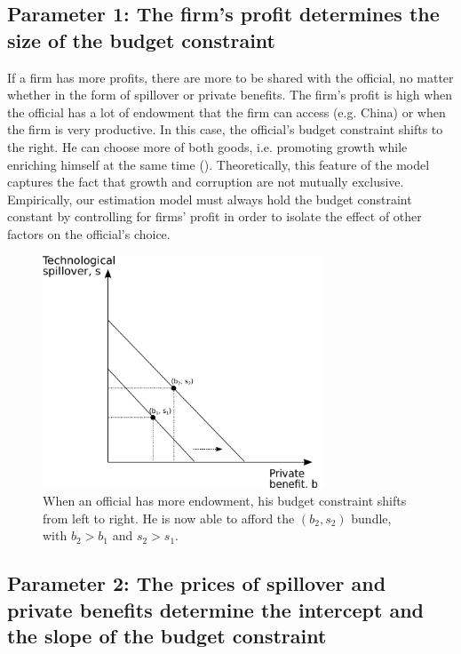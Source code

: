 \subsection{Parameter 1: The firm's profit determines the size of the budget constraint}
\label{sec:theory_budget_constraint_size}

If a firm has more profits, there are more to be shared with the official, no matter whether in the form of spillover or private benefits. The firm's profit is high when the official has a lot of endowment that the firm can access (e.g. China) or when the firm is very productive. In this case, the official's budget constraint shifts to the right. He can choose more of both goods, i.e. promoting growth while enriching himself at the same time (). Theoretically, this feature of the model captures the fact that growth and corruption are not mutually exclusive. Empirically, our estimation model must always hold the budget constraint constant by controlling for firms' profit in order to isolate the effect of other factors on the official's choice.

\begin{figure}[!ht]
	\centering
    \includegraphics[width=0.75\textwidth, height=0.75\textheight,keepaspectratio]{../figure/budget_constraint}
    \caption{When an official has more endowment, his budget constraint shifts from left to right. He is now able to afford the $(b_2, s_2)$ bundle, with $b_2 > b_1$ and $s_2 > s_1$.}
    \label{fig:budget_constraint}
\end{figure}

\subsection{Parameter 2: The prices of spillover and private benefits determine the intercept and the slope of the budget constraint}
\label{sec:theory_budget_constraint_slope_and_intercept}

